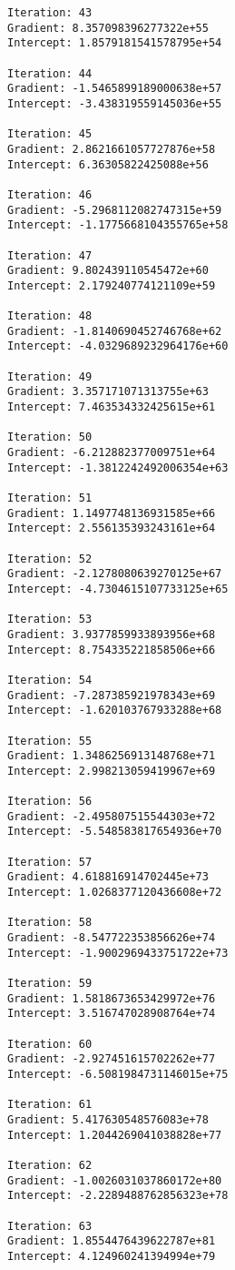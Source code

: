 \documentclass[11pt]{article}
\begin{document}
\begin{Verbatim}[commandchars=\\\{\}]
Iteration: 43 
Gradient: 8.357098396277322e+55 
Intercept: 1.8579181541578795e+54 

Iteration: 44 
Gradient: -1.5465899189000638e+57 
Intercept: -3.438319559145036e+55 

Iteration: 45 
Gradient: 2.8621661057727876e+58 
Intercept: 6.36305822425088e+56 

Iteration: 46 
Gradient: -5.2968112082747315e+59 
Intercept: -1.1775668104355765e+58 

Iteration: 47 
Gradient: 9.802439110545472e+60 
Intercept: 2.179240774121109e+59 

Iteration: 48 
Gradient: -1.8140690452746768e+62 
Intercept: -4.0329689232964176e+60 

Iteration: 49 
Gradient: 3.357171071313755e+63 
Intercept: 7.463534332425615e+61 

Iteration: 50 
Gradient: -6.212882377009751e+64 
Intercept: -1.3812242492006354e+63 

Iteration: 51 
Gradient: 1.1497748136931585e+66 
Intercept: 2.556135393243161e+64 

Iteration: 52 
Gradient: -2.1278080639270125e+67 
Intercept: -4.7304615107733125e+65 

Iteration: 53 
Gradient: 3.9377859933893956e+68 
Intercept: 8.754335221858506e+66 

Iteration: 54 
Gradient: -7.287385921978343e+69 
Intercept: -1.620103767933288e+68 

Iteration: 55 
Gradient: 1.3486256913148768e+71 
Intercept: 2.998213059419967e+69 

Iteration: 56 
Gradient: -2.495807515544303e+72 
Intercept: -5.548583817654936e+70 

Iteration: 57 
Gradient: 4.618816914702445e+73 
Intercept: 1.0268377120436608e+72 

Iteration: 58 
Gradient: -8.547722353856626e+74 
Intercept: -1.9002969433751722e+73 

Iteration: 59 
Gradient: 1.5818673653429972e+76 
Intercept: 3.516747028908764e+74 

Iteration: 60 
Gradient: -2.927451615702262e+77 
Intercept: -6.5081984731146015e+75 

Iteration: 61 
Gradient: 5.417630548576083e+78 
Intercept: 1.2044269041038828e+77 

Iteration: 62 
Gradient: -1.0026031037860172e+80 
Intercept: -2.2289488762856323e+78 

Iteration: 63 
Gradient: 1.8554476439622787e+81 
Intercept: 4.124960241394994e+79 


\end{Verbatim}
\end{document}

